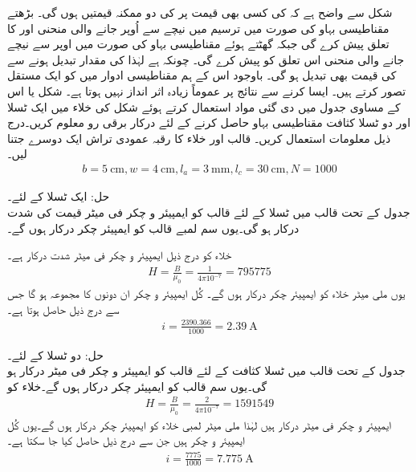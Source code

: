 شکل  سے واضح ہے کہ  کی کسی بھی قیمت پر  کی  دو ممکنہ قیمتیں ہوں گی۔ بڑھتے مقناطیسی بہاو کی صورت میں ترسیم میں نیچے سے اُوپر جانے والی منحنی  اور  کا تعلق پیش کرے گی جبکہ گھٹتے ہوئے مقناطیسی بہاو کی صورت میں  اوپر سے نیچے جانے والی منحنی اس تعلق کو پیش کرے  گی۔  چونکہ  ہے  لہٰذا  کی  مقدار تبدیل ہونے سے  کی قیمت  بھی تبدیل ہو گی۔ باوجود اس کے ہم مقناطیسی ادوار میں   کو ایک مستقل تصور کرتے ہیں۔ ایسا کرنے سے نتائج پر عموماً زیادہ اثر انداز نہیں ہوتا ہے۔
%
شکل   یا اس کے مساوی جدول  میں دی گئی مواد  استعمال کرتے ہوئے شکل   کی خلاء میں ایک ٹسلا اور دو ٹسلا کثافت  مقناطیسی بہاو حاصل کرنے کے لئے درکار برقی رو معلوم کریں۔درج ذیل معلومات استعمال کریں۔ قالب اور خلاء کا رقبہ عمودی تراش ایک دوسرے جتنا لیں۔
\begin{align*}
b=\SI{5}{\centi\meter},w=\SI{4}{\centi\meter},l_a=\SI{3}{\milli\meter},l_c=\SI{30}{\centi\meter},N=1000
\end{align*}


حل:\quad
 ایک ٹسلا کے لئے۔\\
 جدول  کے تحت قالب میں  ٹسلا  کے لئے  قالب کو   ایمپیئر و چکر فی  میٹر قیمت کی شدت   درکار ہو گی۔یوں  سم لمبے قالب کو   ایمپیئر چکر درکار ہوں گے۔

خلاء کو درج ذیل ایمپیئر و چکر فی میٹر شدت درکار ہے۔
\begin{align*}
H=\frac{B}{\mu_0}=\frac{1}{4\pi 10^{-7}}=\num{795775}
\end{align*}
یوں  ملی میٹر  خلاء کو  ایمپیئر چکر درکار ہوں گے۔ کُل ایمپیئر و چکر ان دونوں کا مجموعہ  ہو گا جس سے  درج ذیل حاصل ہوتا ہے۔
\begin{align*}
i=\frac{2390.366}{1000}=\SI{2.39}{\ampere}
\end{align*}	

حل: دو ٹسلا کے لئے۔\\
جدول  کے تحت قالب میں  ٹسلا  کثافت کے لئے  قالب کو  ایمپیئر و چکر فی میٹر  درکار ہو گی۔یوں  سم  قالب کو  ایمپیئر چکر درکار ہوں گے۔خلاء کو
\begin{align*}
H=\frac{B}{\mu_0}=\frac{2}{4\pi 10^{-7}}=\num{1591549}
\end{align*}
ایمپیئر و چکر فی میٹر درکار ہیں لہٰذا  ملی میٹر لمبی خلاء کو    ایمپیئر چکر درکار ہوں گے۔یوں کُل ایمپیئر و چکر  ہیں جن سے  درج ذیل حاصل کیا جا سکتا ہے۔
\begin{align*}
i=\frac{7775}{1000}=\SI{7.775}{\ampere}
\end{align*}

